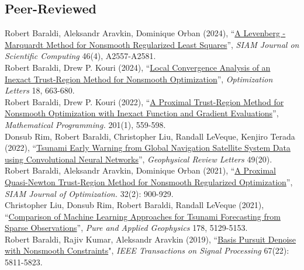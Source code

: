 \documentclass[11pt, a4paper]{article}
\newcommand{\years}[1]{\marginnote{#1}}
\begin{document}
\subsection*{Peer-Reviewed}
\years{2024} Robert Baraldi, Aleksandr Aravkin, Dominique Orban (2024), ``\href{https://doi.org/10.1137/22M1538971}{A Levenberg - Marquardt Method for Nonsmooth Regularized Least Squares}'',  \emph{SIAM Journal on Scientific Computing} 46(4), A2557-A2581.\\
\years{2024} Robert Baraldi, Drew P. Kouri (2024), ``\href{https://link.springer.com/article/10.1007/s11590-023-02092-8}{Local Convergence Analysis of an Inexact Trust-Region Method for Nonsmooth Optimization}'', \emph{Optimization Letters} 18, 663-680.\\
\years{2022} Robert Baraldi, Drew P. Kouri (2022), ``\href{https://link.springer.com/article/10.1007/s10107-022-01915-3}{A Proximal Trust-Region Method for Nonsmooth Optimization with Inexact Function and Gradient Evaluations}'', \emph{Mathematical Programming.} 201(1), 559-598.\\
\years{2022} Donsub Rim, Robert Baraldi, Christopher Liu, Randall LeVeque, Kenjiro Terada (2022), ``\href{https://agupubs.onlinelibrary.wiley.com/doi/full/10.1029/2022GL099511}{Tsunami Early Warning from Global Navigation Satellite System Data using Convolutional Neural Networks}'', \emph{Geophysical Review Letters} 49(20).\\
\noindent
\years{2021} Robert Baraldi, Aleksandr Aravkin, Dominique Orban (2021), ``\href{https://epubs.siam.org/doi/abs/10.1137/21M1409536}{A Proximal Quasi-Newton Trust-Region Method for Nonsmooth Regularized Optimization}'', \emph{SIAM Journal of Optimization.} 32(2): 900-929.\\
\years{2021} Christopher Liu, Donsub Rim, Robert Baraldi, Randall LeVeque (2021), ``\href{https://link.springer.com/article/10.1007/s00024-021-02841-9}{Comparison of Machine Learning Approaches for Tsunami Forecasting from Sparse Observations}'', \emph{Pure and Applied Geophysics} 178, 5129-5153. \\
\noindent
\years{2019} Robert Baraldi, Rajiv Kumar, Aleksandr Aravkin  (2019), “\href{https://ieeexplore.ieee.org/document/8861392}{Basis Pursuit Denoise with Nonsmooth Constraints}", \emph{IEEE Transactions on Signal Processing} 67(22): 5811-5823.\\
\end{document}
